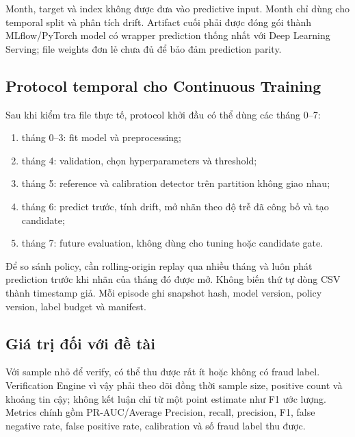 Month, target và index không được đưa vào predictive input. Month chỉ dùng cho temporal split và phân tích drift. Artifact cuối phải được đóng gói thành MLflow/PyTorch model có wrapper prediction thống nhất với Deep Learning Serving; file weights  đơn lẻ chưa đủ để bảo đảm prediction parity.

\subsection{Protocol temporal cho Continuous Training}

Sau khi kiểm tra file thực tế, protocol khởi đầu có thể dùng các tháng 0--7:

\begin{enumerate}
  \item tháng 0--3: fit model và preprocessing;
  \item tháng 4: validation, chọn hyperparameters và threshold;
  \item tháng 5: reference và calibration detector trên partition không giao nhau;
  \item tháng 6: predict trước, tính drift, mở nhãn theo độ trễ đã công bố và tạo candidate;
  \item tháng 7: future evaluation, không dùng cho tuning hoặc candidate gate.
\end{enumerate}

Để so sánh policy, cần rolling-origin replay qua nhiều tháng và luôn phát prediction trước khi nhãn của tháng đó được mở. Không biến thứ tự dòng CSV thành timestamp giả. Mỗi episode ghi snapshot hash, model version, policy version, label budget và manifest.

\subsection{Giá trị đối với đề tài}

Với sample nhỏ để verify, có thể thu được rất ít hoặc không có fraud label. Verification Engine vì vậy phải theo dõi đồng thời sample size, positive count và khoảng tin cậy; không kết luận chỉ từ một point estimate như F1 ước lượng. Metrics chính gồm PR-AUC/Average Precision, recall, precision, F1, false negative rate, false positive rate, calibration và số fraud label thu được.

